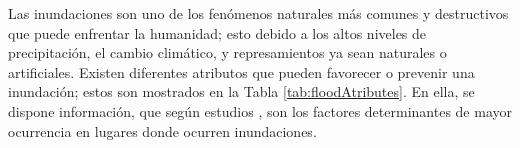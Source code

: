 Las inundaciones son uno de los fenómenos naturales más comunes y destructivos que puede enfrentar la humanidad; esto debido a los altos niveles de precipitación, el cambio climático, y represamientos ya sean naturales o artificiales. Existen diferentes atributos que pueden favorecer o prevenir una inundación; estos son mostrados en la Tabla \ref{tab:floodAtributes}. En ella, se dispone información, que según estudios \citep{floodAtributes}, son los factores determinantes de mayor ocurrencia en lugares donde ocurren inundaciones.

\begin{table}[ht!]
\centering
{}
\end{table}
